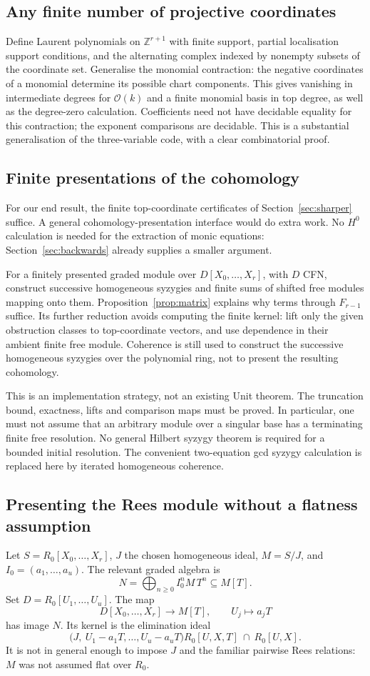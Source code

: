 \documentclass[11pt]{amsart}
\theoremstyle{definition}
\theoremstyle{remark}
\newcommand{\OO}{\mathcal O}
\begin{document}
\subsection{Any finite number of projective coordinates}
Define Laurent polynomials on $\mathbb Z^{r+1}$ with finite support,
partial localisation support conditions, and the alternating complex
indexed by nonempty subsets of the coordinate set. Generalise the
monomial contraction: the negative coordinates of a monomial determine
its possible chart components. This gives vanishing in intermediate
degrees for $\OO(k)$ and a finite monomial basis in top degree, as
well as the degree-zero calculation. Coefficients need not have
decidable equality for this contraction; the exponent comparisons are
decidable. This is a substantial generalisation of the three-variable
code, with a clear combinatorial proof.

\subsection{Finite presentations of the cohomology}
For our end result, the finite top-coordinate certificates of
Section~\ref{sec:sharper} suffice. A general cohomology-presentation
interface would do extra work. No $H^0$ calculation is needed for
the extraction of monic equations: Section~\ref{sec:backwards}
already supplies a smaller argument.

For a finitely presented graded module over
$D[X_0,\ldots,X_r]$, with $D$ CFN, construct successive homogeneous
syzygies and finite sums of shifted free modules mapping onto them.
Proposition~\ref{prop:matrix} explains why terms through $F_{r-1}$
suffice. Its further reduction avoids computing the finite kernel:
lift only the given obstruction classes to top-coordinate vectors,
and use dependence in their ambient finite free module. Coherence
is still used to construct the successive homogeneous syzygies over
the polynomial ring, not to present the resulting cohomology.

This is an implementation strategy, not an existing Unit theorem.
The truncation bound, exactness, lifts and comparison maps must be
proved. In particular, one must not assume that an arbitrary module
over a singular base has a terminating finite free resolution.
No general Hilbert syzygy theorem is required for a bounded initial
resolution. The convenient two-equation gcd syzygy calculation is
replaced here by iterated homogeneous coherence.

\subsection{Presenting the Rees module without a flatness assumption}
Let $S=R_0[X_0,\ldots,X_r]$, $J$ the chosen homogeneous ideal,
$M=S/J$, and $I_0=(a_1,\ldots,a_u)$. The relevant graded algebra is
\[
 N=\bigoplus_{n\geq0} I_0^nM\,T^n\subseteq M[T].
\]
Set $D=R_0[U_1,\ldots,U_u]$. The map
\[
 D[X_0,\ldots,X_r]\longrightarrow M[T],\qquad U_j\longmapsto a_jT
\]
has image $N$. Its kernel is the elimination ideal
\[
 \bigl(J,\ U_1-a_1T,\ldots,U_u-a_uT\bigr)
 R_0[U,X,T]\ \cap\ R_0[U,X].
\]
It is not in general enough to impose $J$ and the familiar pairwise
Rees relations: $M$ was not assumed flat over $R_0$.
\end{document}
